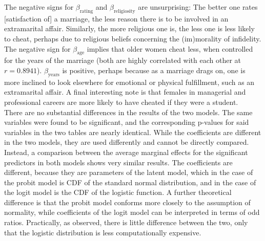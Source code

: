 \documentclass{article}
\begin{document}
\begin{enumerate}[label=(\alph*)]
The negative signs for $\beta_{\text{rating}}$  and $\beta_{\text{religiosity}}$ are unsurprising: The better one rates [satisfaction of] a marriage, the less reason there is to be involved in an extramarital affair. Similarly, the more religious one is, the less one is less likely to cheat, perhaps due to religious beliefs concerning the (im)morality of infidelity. The negative sign for $\beta_{\text{age}}$ implies that older women cheat less, when controlled for the years of the marriage (both are highly correlated with each other at $r =  0.8941$). $\beta_{\text{years}}$ is positive, perhaps because as a marriage drags on, one is more inclined to look elsewhere for emotional or physical fulfillment, such as an extramarital affair. A final interesting note is that females in managerial and professional careers are more likely to have cheated if they were a student. \\

There are no substantial differences in the results of the two models. The same variables were found to be significant, and the corresponding p-values for said variables in the two tables are nearly identical. While the coefficients are different in the two models, they are used differently and cannot be directly compared. Instead, a comparison between the average marginal effects for the significant predictors in both models shows very similar results. The coefficients are different, because they are parameters of the latent model, which in the case of the probit model is CDF of the standard normal distribution, and in the case of the logit model is the CDF of the logistic function. A further theoretical difference is that the probit model conforms more closely to the assumption of normality, while coefficients of the logit model can be interpreted in terms of odd ratios. Practically, as observed, there is little difference between the two, only that the logistic distribution is less computationally expensive. \\


\end{enumerate}
\end{document}
